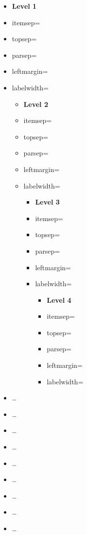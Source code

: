 \documentclass{sigchi-alternate}
\begin{document}
\begin{itemize}
  \item \textbf{Level 1}
  \item itemsep=\the\itemsep
  \item topsep=\the\topsep
  \item parsep=\the\parsep
  \item leftmargin=\the\leftmargin
  \item labelwidth=\the{}
  \begin{itemize}
    \item \textbf{Level 2}
    \item itemsep=\the\itemsep
    \item topsep=\the\topsep
    \item parsep=\the\parsep
    \item leftmargin=\the\leftmargin
    \item labelwidth=\the{}
    \begin{itemize}
      \item \textbf{Level 3}
      \item itemsep=\the\itemsep
      \item topsep=\the\topsep
      \item parsep=\the\parsep
      \item leftmargin=\the\leftmargin
      \item labelwidth=\the{}
      \begin{itemize}
        \item \textbf{Level 4}
        \item itemsep=\the\itemsep
        \item topsep=\the\topsep
        \item parsep=\the\parsep
        \item leftmargin=\the\leftmargin
        \item labelwidth=\the{}
      \end{itemize}
    \end{itemize}
  \end{itemize}
  \item \ldots
  \item \ldots
  \item \ldots
  \item \ldots
  \item \ldots
  \item \ldots
  \item \ldots
  \item \ldots
  \item \ldots
\end{itemize}
\end{document}

